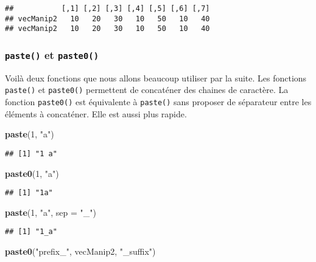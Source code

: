 \documentclass[]{book}
\newenvironment{Shaded}{\begin{snugshade}}{\end{snugshade}}
\newcommand{\KeywordTok}[1]{\textcolor[rgb]{0.13,0.29,0.53}{\textbf{#1}}}
\newcommand{\DataTypeTok}[1]{\textcolor[rgb]{0.13,0.29,0.53}{#1}}
\newcommand{\DecValTok}[1]{\textcolor[rgb]{0.00,0.00,0.81}{#1}}
\newcommand{\StringTok}[1]{\textcolor[rgb]{0.31,0.60,0.02}{#1}}
\newcommand{\NormalTok}[1]{#1}
\theoremstyle{definition}
\theoremstyle{definition}
\theoremstyle{definition}
\theoremstyle{remark}
\begin{document}
\begin{verbatim}
##           [,1] [,2] [,3] [,4] [,5] [,6] [,7]
## vecManip2   10   20   30   10   50   10   40
## vecManip2   10   20   30   10   50   10   40
\end{verbatim}

\subsubsection{\texorpdfstring{\texttt{paste()} et
\texttt{paste0()}}{paste() et paste0()}}\label{l015paste}

Voilà deux fonctions que nous allons beaucoup utiliser par la suite. Les
fonctions \texttt{paste()} et \texttt{paste0()} permettent de concaténer
des chaines de caractère. La fonction \texttt{paste0()} est équivalente
à \texttt{paste()} sans proposer de séparateur entre les éléments à
concaténer. Elle est aussi plus rapide.

\begin{Shaded}
\begin{Highlighting}[]
\KeywordTok{paste}\NormalTok{(}\DecValTok{1}\NormalTok{, }\StringTok{"a"}\NormalTok{)}
\end{Highlighting}
\end{Shaded}

\begin{verbatim}
## [1] "1 a"
\end{verbatim}

\begin{Shaded}
\begin{Highlighting}[]
\KeywordTok{paste0}\NormalTok{(}\DecValTok{1}\NormalTok{, }\StringTok{"a"}\NormalTok{)}
\end{Highlighting}
\end{Shaded}

\begin{verbatim}
## [1] "1a"
\end{verbatim}

\begin{Shaded}
\begin{Highlighting}[]
\KeywordTok{paste}\NormalTok{(}\DecValTok{1}\NormalTok{, }\StringTok{"a"}\NormalTok{, }\DataTypeTok{sep =} \StringTok{"_"}\NormalTok{)}
\end{Highlighting}
\end{Shaded}

\begin{verbatim}
## [1] "1_a"
\end{verbatim}

\begin{Shaded}
\begin{Highlighting}[]
\KeywordTok{paste0}\NormalTok{(}\StringTok{"prefix_"}\NormalTok{, vecManip2, }\StringTok{"_suffix"}\NormalTok{)}
\end{Highlighting}
\end{Shaded}
\end{document}
